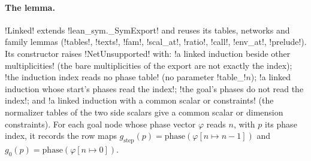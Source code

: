 {\paragraph{The lemma.} \py!Linked! extends \py!lean_sym._SymExport! and reuses its tables,
networks and family lemmas (\py!tables!, \py!texts!, \py!fam!, \py!scal_at!, \py!ratio!,
\py!call!, \py!env_at!, \py!prelude!). Its constructor raises \py!NetUnsupported! with:
\code!a linked induction beside other multiplicities! (the bare multiplicities of the export are
not exactly the index); \code!the induction index reads no phase table! (no parameter
\code!table_!$n$); \code!a linked induction whose start's phases read the index!;
\code!the goal's phases do not read the index!; and
\code!a linked induction with a common scalar or constraints! (the normalizer tables of the two
side scalars give a common scalar or dimension constraints). For each goal node whose phase
vector $\varphi$ reads $n$, with $p$ its phase index, it records the row maps
$g_{\mathrm{step}}(p) = \mathrm{phase}(\varphi[n \mapsto n-1])$ and
$g_{0}(p) = \mathrm{phase}(\varphi[n \mapsto 0])$.

}
